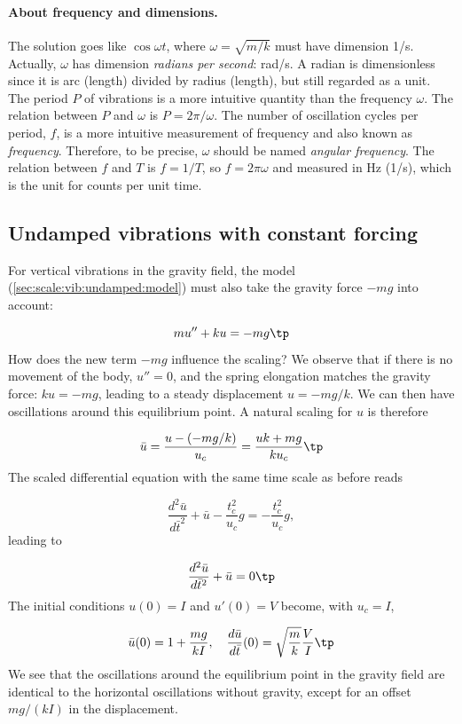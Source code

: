 \documentclass[graybox,envcountchap,sectrefs,final]{svmonodo}
\begin{document}
\paragraph{About frequency and dimensions.}
The solution goes like $\cos\omega t$, where $\omega =\sqrt{m/k}$
must have dimension 1/s. Actually, $\omega$ has dimension \emph{radians
per second}: rad/s. A radian is dimensionless since it is arc (length)
divided by radius (length), but still regarded as a unit.
The period $P$ of vibrations is a more intuitive quantity than the frequency
$\omega$. The relation between $P$ and $\omega$ is $P=2\pi/\omega$.
The number of oscillation cycles per period, $f$, is a more intuitive
measurement of frequency and also known as \emph{frequency}. Therefore, to be
precise, $\omega$ should be named \emph{angular frequency}. The relation between
$f$ and $T$ is $f=1/T$, so $f=2\pi\omega$ and measured in Hz (1/s), which is
the unit for counts per unit time.

\subsection{Undamped vibrations with constant forcing}
\label{sec:scale:vib:undamped:mg}

For vertical vibrations in the gravity field, the model
(\ref{sec:scale:vib:undamped:model}) must also take the gravity force
$-mg$ into account:

\[ mu'' + ku = -mg\tp\]
How does the new term $-mg$ influence
the scaling? We observe that if there is no movement of the body,
$u''=0$, and the spring elongation matches the gravity force:
$ku = -mg$, leading to a steady displacement $u=-mg/k$. We can then
have oscillations around this equilibrium point. A natural scaling
for $u$ is therefore

\[ \bar u = \frac{u - (-mg/k)}{u_c}=\frac{uk + mg}{ku_c}\tp\]
The scaled differential equation with the same time scale as before
reads

\[ \frac{d^2\bar u}{d\bar t^2} + \bar u - \frac{t_c^2}{u_c}g
= -\frac{t_c^2}{u_c}g,\]
leading to

\[ \frac{d^2\bar u}{d\bar t^2} + \bar u = 0\tp\]
The initial conditions $u(0)=I$ and $u'(0)=V$ become, with $u_c=I$,

\[ \bar u(0) = 1 + \frac{mg}{kI},\quad \frac{d\bar u}{d\bar t}(0)=\sqrt{\frac{m}{k}}\frac{V}{I}\tp\]
We see that the oscillations around the equilibrium point in the
gravity field are identical to the horizontal oscillations without
gravity, except for an offset $mg/(kI)$ in the displacement.
\end{document}
